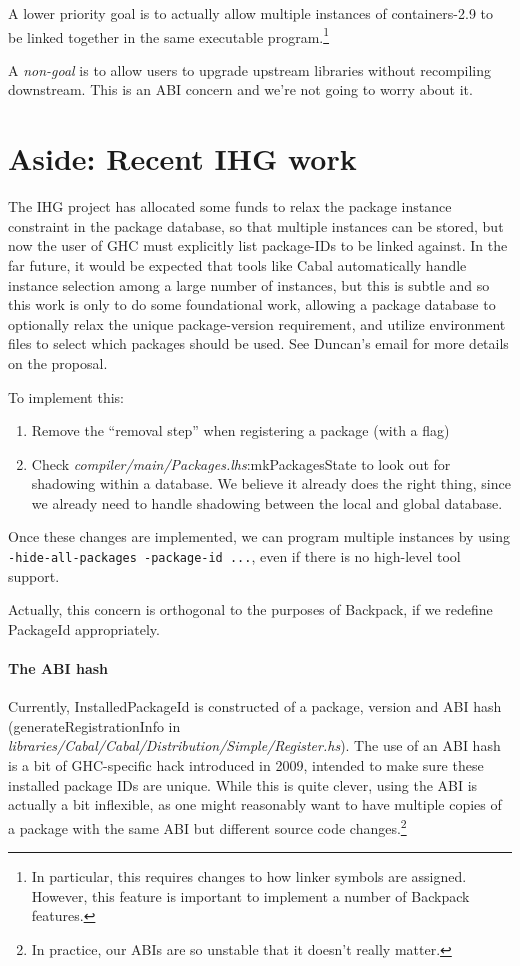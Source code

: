 \documentclass{article}
\newcommand{\ghcfile}[1]{\textsl{#1}}
\begin{document}
A lower priority goal is to actually allow multiple instances of
containers-2.9 to be linked together in the same executable
program.\footnote{In particular, this requires changes to how linker
symbols are assigned. However, this feature is important to
implement a number of Backpack features.}

A \emph{non-goal} is to allow users to upgrade upstream libraries
without recompiling downstream. This is an ABI concern and we're not
going to worry about it.

\section{Aside: Recent IHG work}\label{sec:ihg}

The IHG project has allocated some funds to relax the package instance
constraint in the package database, so that multiple instances can be
stored, but now the user of GHC must explicitly list package-IDs to be
linked against.  In the far future, it would be expected that tools like
Cabal automatically handle instance selection among a large number of
instances, but this is subtle and so this work is only to do some
foundational work, allowing a package database to optionally relax the
unique package-version requirement, and utilize environment files to
select which packages should be used.  See Duncan's email for more
details on the proposal.

To implement this:

\begin{enumerate}

    \item Remove the ``removal step'' when registering a package (with a flag)

    \item Check \ghcfile{compiler/main/Packages.lhs}:mkPackagesState to look out for shadowing
      within a database. We believe it already does the right thing, since
      we already need to handle shadowing between the local and global database.

\end{enumerate}

Once these changes are implemented, we can program multiple instances by
using \verb|-hide-all-packages -package-id ...|, even if there is no
high-level tool support.

Actually, this concern is orthogonal to the purposes of Backpack, if
we redefine PackageId appropriately.

\paragraph{The ABI hash} Currently, InstalledPackageId
is constructed of a package, version and ABI hash
(generateRegistrationInfo in
\ghcfile{libraries/Cabal/Cabal/Distribution/Simple/Register.hs}).  The
use of an ABI hash is a bit of GHC-specific hack introduced in 2009,
intended to make sure these installed package IDs are unique.  While
this is quite clever, using the ABI is actually a bit inflexible, as one
might reasonably want to have multiple copies of a package with the same
ABI but different source code changes.\footnote{In practice, our ABIs
are so unstable that it doesn't really matter.}
\end{document}
